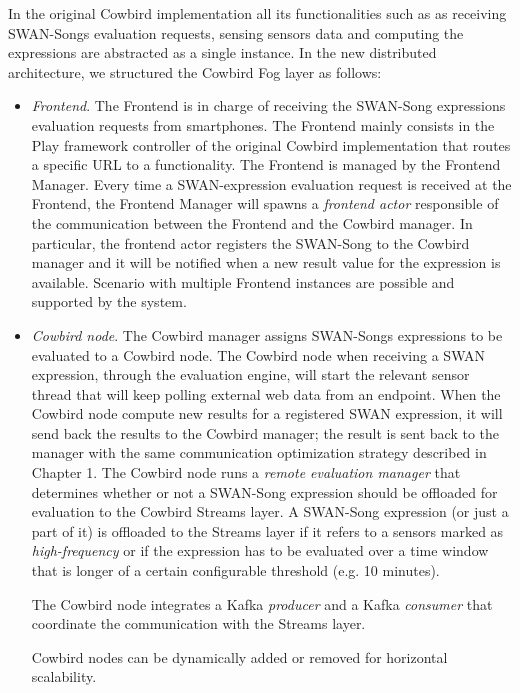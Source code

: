 In the original Cowbird implementation all its functionalities such as as receiving SWAN-Songs evaluation requests, sensing sensors data and computing the expressions are abstracted as a single instance. In the new distributed architecture, we structured the Cowbird Fog layer as follows:
\begin{itemize}
\item \emph{Frontend}. The Frontend is in charge of receiving the SWAN-Song expressions evaluation requests from smartphones. The Frontend mainly consists in the Play framework controller of the original Cowbird implementation that routes a specific URL to a functionality. The Frontend is managed by the Frontend Manager. Every time a SWAN-expression evaluation request is received at the Frontend, the Frontend Manager will spawns a \emph{frontend actor} responsible of the communication between the Frontend and the Cowbird manager. In particular, the frontend actor registers the SWAN-Song to the Cowbird manager and it will be notified when a new result value for the expression is available. Scenario with multiple Frontend instances are possible and supported by the system.

\item	 \emph{Cowbird node}. The Cowbird manager assigns SWAN-Songs expressions to be evaluated to a Cowbird node. The Cowbird node when receiving a SWAN expression, through the evaluation engine, will start the relevant sensor thread that will keep polling external web data from an endpoint. When the Cowbird node compute new results for a registered SWAN expression, it will send back the results to the Cowbird manager; the result is sent back to the manager with the same communication optimization strategy described in Chapter 1. The Cowbird node runs a \emph{remote evaluation manager} that determines whether or not a SWAN-Song expression should be offloaded for evaluation to the Cowbird Streams layer. A SWAN-Song expression (or just a part of it) is offloaded to the Streams layer if it refers to a sensors marked as \emph{high-frequency} or if the expression has to be evaluated over a time window that is longer of a certain configurable threshold (e.g. 10 minutes).

The Cowbird node integrates a Kafka \emph{producer} and a Kafka \emph{consumer} that coordinate the communication with the Streams layer. 

Cowbird nodes can be dynamically added or removed for horizontal scalability.


\end{itemize}
